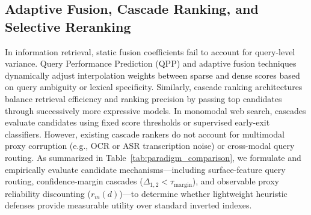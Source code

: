 \documentclass[conference]{IEEEtran}
\begin{document}
\subsection{Adaptive Fusion, Cascade Ranking, and Selective Reranking}
In information retrieval, static fusion coefficients fail to account for query-level variance. Query Performance Prediction (QPP) \cite{carmel2010qpp} and adaptive fusion techniques dynamically adjust interpolation weights between sparse and dense scores based on query ambiguity or lexical specificity. Similarly, cascade ranking architectures \cite{wang2011cascade, gallagher2019cascade} balance retrieval efficiency and ranking precision by passing top candidates through successively more expressive models. In monomodal web search, cascades evaluate candidates using fixed score thresholds or supervised early-exit classifiers. However, existing cascade rankers do not account for multimodal proxy corruption (e.g., OCR or ASR transcription noise) or cross-modal query routing. As summarized in Table~\ref{tab:paradigm_comparison}, we formulate and empirically evaluate candidate mechanisms—including surface-feature query routing, confidence-margin cascades ($\Delta_{1,2} < \tau_{\text{margin}}$), and observable proxy reliability discounting ($r_m(d)$)—to determine whether lightweight heuristic defenses provide measurable utility over standard inverted indexes.

\begin{table}[t]
\centering
\caption{Architectural comparison of multimodal retrieval and ranking paradigms. Note: As demonstrated empirically in Section~IV, surface routing and heuristic reliability weighting are refuted by the benchmark data and fail to outperform unweighted fusion.}
\label{tab:paradigm_comparison}
\end{table}
\end{document}
